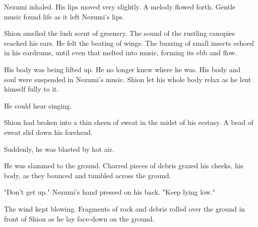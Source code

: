 Nezumi inhaled. His lips moved very slightly. A melody flowed forth.
Gentle music found life as it left Nezumi's lips.

Shion smelled the lush scent of greenery. The sound of the rustling
canopies reached his ears. He felt the beating of wings. The buzzing of
small insects echoed in his eardrums, until even that melted into music,
forming its ebb and flow.

His body was being lifted up. He no longer knew where he was. His body
and soul were suspended in Nezumi's music. Shion let his whole body
relax as he lent himself fully to it.

He could hear singing.

\clearpage



Shion had broken into a thin sheen of sweat in the midst of his ecstasy.
A bead of sweat slid down his forehead.

Suddenly, he was blasted by hot air.

He was slammed to the ground. Charred pieces of debris grazed his
cheeks, his body, as they bounced and tumbled across the ground.

"Don't get up." Nezumi's hand pressed on his back. "Keep lying low."

The wind kept blowing. Fragments of rock and debris rolled over the
ground in front of Shion as he lay face-down on the ground.



